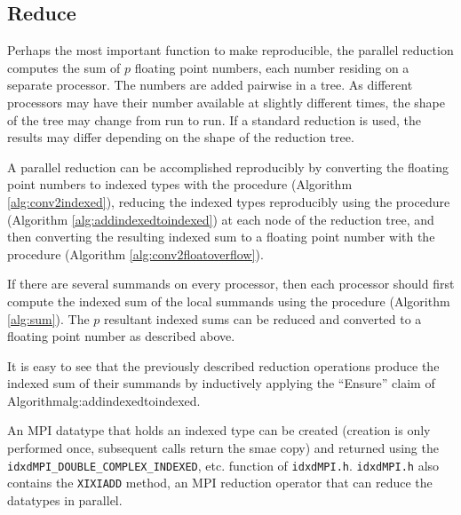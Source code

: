 \subsection{Reduce}
  \label{sec:compositeops_reduce}
  Perhaps the most important function to make reproducible, the parallel reduction computes the sum of $p$ floating point numbers, each number residing on a separate processor. The numbers are added pairwise in a tree. As different processors may have their number available at slightly different times, the shape of the tree may change from run to run. If a standard reduction is used, the results may differ depending on the shape of the reduction tree.

  A parallel reduction can be accomplished reproducibly by converting the floating point numbers to indexed types with the  procedure (Algorithm \ref{alg:conv2indexed}), reducing the indexed types reproducibly using the  procedure (Algorithm \ref{alg:addindexedtoindexed}) at each node of the reduction tree, and then converting the resulting indexed sum to a floating point number with the  procedure (Algorithm \ref{alg:conv2floatoverflow}). 

  If there are several summands on every processor, then each processor should first compute the indexed sum of the local summands using the  procedure (Algorithm \ref{alg:sum}). The $p$ resultant indexed sums can be reduced and converted to a floating point number as described above.

  It is easy to see that the previously described reduction operations produce the indexed sum of their summands by inductively applying the ``Ensure'' claim of Algorithm{alg:addindexedtoindexed}.

  An MPI datatype that holds an indexed type can be created (creation is only performed once, subsequent calls return the smae copy) and returned using the \texttt{idxdMPI_DOUBLE_COMPLEX_INDEXED}, etc. function of \texttt{idxdMPI.h}. \texttt{idxdMPI.h} also contains the \texttt{XIXIADD} method, an MPI reduction operator that can reduce the datatypes in parallel.
